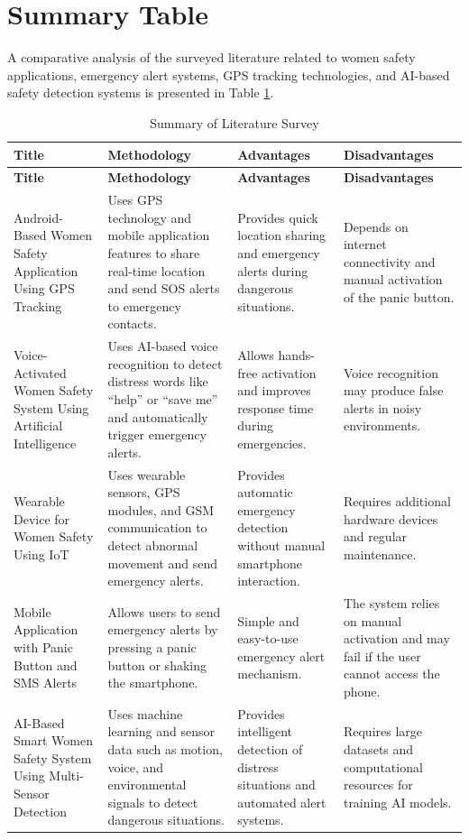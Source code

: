 \documentclass[a4paper,12pt]{report}
\begin{document}
\section{Summary Table}
\par A comparative analysis of the surveyed literature related to women safety applications, emergency alert systems, GPS tracking technologies, and AI-based safety detection systems is presented in Table
\ref{tab:summary}.
\begin{longtable}{|p{4cm}|p{4cm}|p{3cm}|p{3cm}|}
\caption{Summary of Literature Survey} 
\label{tab:summary}\\
\hline
\textbf{Title} & \textbf{Methodology} & \textbf{Advantages} & \textbf{Disadvantages} \\
\hline
\endfirsthead
\hline
\textbf{Title} & \textbf{Methodology} & \textbf{Advantages} & \textbf{Disadvantages} \\
\hline
\endhead

Android-Based Women Safety Application Using GPS Tracking &
Uses GPS technology and mobile application features to share real-time location and send SOS alerts to emergency contacts. &
Provides quick location sharing and emergency alerts during dangerous situations. &
Depends on internet connectivity and manual activation of the panic button.\\
\hline

Voice-Activated Women Safety System Using Artificial Intelligence &
Uses AI-based voice recognition to detect distress words like “help” or “save me” and automatically trigger emergency alerts. &
Allows hands-free activation and improves response time during emergencies. &
Voice recognition may produce false alerts in noisy environments.\\
\hline
Wearable Device for Women Safety Using IoT &
Uses wearable sensors, GPS modules, and GSM communication to detect abnormal movement and send emergency alerts. &
Provides automatic emergency detection without manual smartphone interaction. &
Requires additional hardware devices and regular maintenance. \\
\hline

Mobile Application with Panic Button and SMS Alerts &
Allows users to send emergency alerts by pressing a panic button or shaking the smartphone. &
Simple and easy-to-use emergency alert mechanism. &
The system relies on manual activation and may fail if the user cannot access the phone.\\
\hline

AI-Based Smart Women Safety System Using Multi-Sensor Detection &
Uses machine learning and sensor data such as motion, voice, and environmental signals to detect dangerous situations. &
Provides intelligent detection of distress situations and automated alert systems. &
Requires large datasets and computational resources for training AI models. \\
\hline

\end{longtable}
\end{document}
